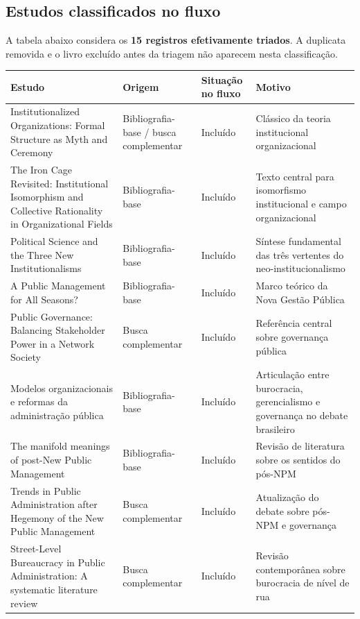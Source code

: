 \documentclass[12pt]{article}
\begin{document}
\subsection{Estudos classificados no fluxo}
\label{sec:orgca26e86}

A tabela abaixo considera os \textbf{15 registros efetivamente triados}. A duplicata removida e o livro excluído antes da triagem não aparecem nesta classificação.

\begin{table}[htbp]
\centering
\scriptsize
\setlength{\tabcolsep}{3pt}
\renewcommand{\arraystretch}{1.15}
\begin{tabularx}{\textwidth}{>{\raggedright\arraybackslash}X >{\raggedright\arraybackslash}m{} >{\raggedright\arraybackslash}m{} >{\raggedright\arraybackslash}m{}}
\toprule
Estudo & Origem & Situação no fluxo & Motivo \\
\midrule
Institutionalized Organizations: Formal Structure as Myth and Ceremony & Bibliografia-base / busca complementar & Incluído & Clássico da teoria institucional organizacional \\
The Iron Cage Revisited: Institutional Isomorphism and Collective Rationality in Organizational Fields & Bibliografia-base & Incluído & Texto central para isomorfismo institucional e campo organizacional \\
Political Science and the Three New Institutionalisms & Bibliografia-base & Incluído & Síntese fundamental das três vertentes do neo-institucionalismo \\
A Public Management for All Seasons? & Bibliografia-base & Incluído & Marco teórico da Nova Gestão Pública \\
Public Governance: Balancing Stakeholder Power in a Network Society & Busca complementar & Incluído & Referência central sobre governança pública \\
Modelos organizacionais e reformas da administração pública & Bibliografia-base & Incluído & Articulação entre burocracia, gerencialismo e governança no debate brasileiro \\
The manifold meanings of post-New Public Management & Bibliografia-base & Incluído & Revisão de literatura sobre os sentidos do pós-NPM \\
Trends in Public Administration after Hegemony of the New Public Management & Busca complementar & Incluído & Atualização do debate sobre pós-NPM e governança \\
Street-Level Bureaucracy in Public Administration: A systematic literature review & Busca complementar & Incluído & Revisão contemporânea sobre burocracia de nível de rua \\

\end{tabularx}
\end{table}
\end{document}
